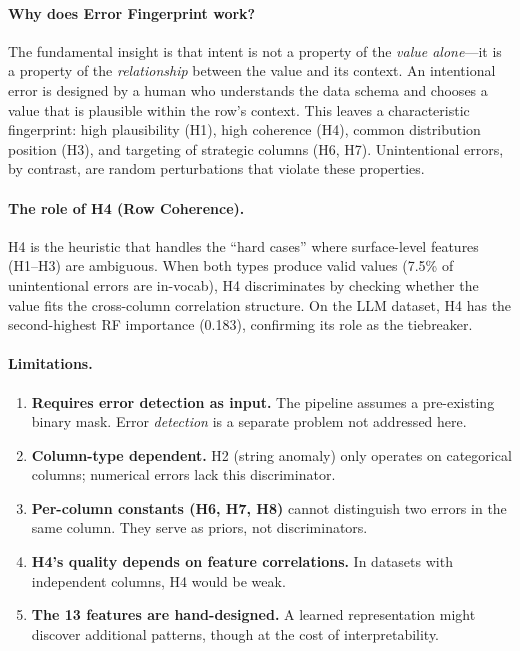 \documentclass[11pt,a4paper]{article}
\begin{document}
\paragraph{Why does Error Fingerprint work?}

The fundamental insight is that intent is not a property of the \emph{value
alone}---it is a property of the \emph{relationship} between the value and
its context.  An intentional error is designed by a human who understands
the data schema and chooses a value that is plausible within the row's
context.  This leaves a characteristic fingerprint: high plausibility
(H1), high coherence (H4), common distribution position (H3), and
targeting of strategic columns (H6, H7).  Unintentional errors, by contrast,
are random perturbations that violate these properties.

\paragraph{The role of H4 (Row Coherence).}

H4 is the heuristic that handles the ``hard cases'' where surface-level
features (H1--H3) are ambiguous.  When both types produce valid values
(7.5\% of unintentional errors are in-vocab), H4 discriminates by checking
whether the value fits the cross-column correlation structure.  On the LLM
dataset, H4 has the second-highest RF importance (0.183), confirming its
role as the tiebreaker.

\paragraph{Limitations.}

\begin{enumerate}[nosep]
  \item \textbf{Requires error detection as input.}  The pipeline assumes a
        pre-existing binary mask.  Error \emph{detection} is a separate
        problem not addressed here.
  \item \textbf{Column-type dependent.}  H2 (string anomaly) only operates
        on categorical columns; numerical errors lack this discriminator.
  \item \textbf{Per-column constants (H6, H7, H8)} cannot distinguish two
        errors in the same column.  They serve as priors, not discriminators.
  \item \textbf{H4's quality depends on feature correlations.}  In datasets
        with independent columns, H4 would be weak.
  \item \textbf{The 13 features are hand-designed.}  A learned representation
        might discover additional patterns, though at the cost of
        interpretability.
\end{enumerate}
\end{document}
